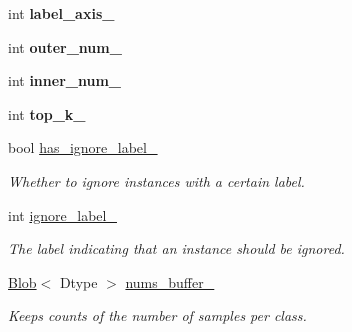 \begin{DoxyCompactItemize}
\item 
\mbox{\label{classcaffe_1_1_accuracy_layer_aafbbed754511b427a65d9f95707e9455}} 
int {\bfseries label\+\_\+axis\+\_\+}
\item 
\mbox{\label{classcaffe_1_1_accuracy_layer_a374b3c8ce90238ec1769abf1b3b3f748}} 
int {\bfseries outer\+\_\+num\+\_\+}
\item 
\mbox{\label{classcaffe_1_1_accuracy_layer_aede524eb7411cc81e3d5e62a34e96a4d}} 
int {\bfseries inner\+\_\+num\+\_\+}
\item 
\mbox{\label{classcaffe_1_1_accuracy_layer_a1048e10c5a499ace931cbafb9cd790d9}} 
int {\bfseries top\+\_\+k\+\_\+}
\item 
\mbox{\label{classcaffe_1_1_accuracy_layer_a4acdfaf6db79fbe1983b8439391ad15e}} 
bool \mbox{\hyperlink{classcaffe_1_1_accuracy_layer_a4acdfaf6db79fbe1983b8439391ad15e}{has\+\_\+ignore\+\_\+label\+\_\+}}
\begin{DoxyCompactList}\small\item\em Whether to ignore instances with a certain label. \end{DoxyCompactList}\item 
\mbox{\label{classcaffe_1_1_accuracy_layer_a2b8c2d647f43ffd6aa14e81f1c5b2bde}} 
int \mbox{\hyperlink{classcaffe_1_1_accuracy_layer_a2b8c2d647f43ffd6aa14e81f1c5b2bde}{ignore\+\_\+label\+\_\+}}
\begin{DoxyCompactList}\small\item\em The label indicating that an instance should be ignored. \end{DoxyCompactList}\item 
\mbox{\label{classcaffe_1_1_accuracy_layer_a9a642737f2e174db2f7254decbb0f9f8}} 
\mbox{\hyperlink{classcaffe_1_1_blob}{Blob}}$<$ Dtype $>$ \mbox{\hyperlink{classcaffe_1_1_accuracy_layer_a9a642737f2e174db2f7254decbb0f9f8}{nums\+\_\+buffer\+\_\+}}
\begin{DoxyCompactList}\small\item\em Keeps counts of the number of samples per class. \end{DoxyCompactList}\end{DoxyCompactItemize}


